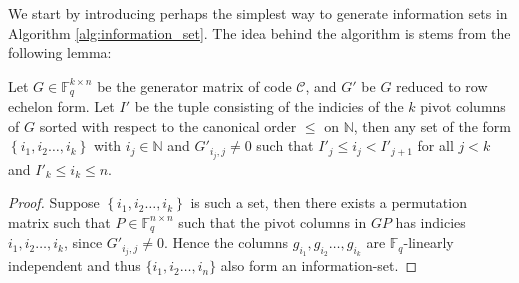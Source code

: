 We start by introducing perhaps the simplest way to generate information sets in Algorithm \ref{alg:information_set}. The idea behind the algorithm is stems from the following lemma:
\begin{lemma}\label{lem:new_information_sets}
  Let $G \in \mathbb{F}_q^{k \times n}$ be the generator matrix of code $\mathcal{C}$, and $G'$ be $G$ reduced to row echelon form. Let $I'$ be the tuple consisting of the indicies of the $k$ pivot columns of $G$ sorted with respect to the canonical order $\leq$ on $\mathbb{N}$, then any set of the form $\left\{i_1, i_2 \ldots, i_{k}\right\}$ with $i_j \in \mathbb{N}$ and $G'_{i_j,j} \neq 0$ such that $I'_j \leq i_j < I'_{j + 1}$ for all $j < k$ and $I'_k \leq i_k \leq n$.
\end{lemma}
\begin{proof}
  Suppose $\left\{i_1, i_2 \ldots, i_{k}\right\}$ is such a set, then there exists a permutation matrix such that $P \in \mathbb{F}_q^{n \times n}$ such that the pivot columns in $GP$ has indicies $i_1, i_2 \ldots, i_{k}$, since $G'_{i_{j}, j} \neq 0$. Hence the columns $g_{i_1}, g_{i_2} \ldots, g_{i_{k}}$ are $\mathbb{F}_q$-linearly independent and thus $\{i_1, i_2 \ldots, i_{n}\}$ also form an information-set.
\end{proof}

